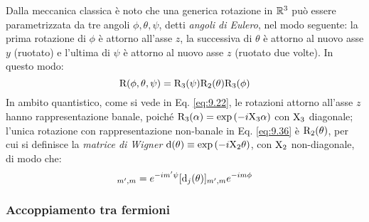 Dalla meccanica classica è noto che una generica rotazione in $ \mathbb{R}^3 $ può essere parametrizzata da tre angoli $ \phi,\theta,\psi $, detti \textit{angoli di Eulero}, nel modo seguente: la prima rotazione di $ \phi $ è attorno all'asse $ z $, la successiva di $ \theta $ è attorno al nuovo asse $ y $ (ruotato) e l'ultima di $ \psi $ è attorno al nuovo asse $ z $ (ruotato due volte). In questo modo:
\begin{equation}
	\mathrm{R}(\phi,\theta,\psi) = \mathrm{R}_3(\psi) \mathrm{R}_2(\theta) \mathrm{R}_3(\phi)
	\label{eq:9.36}
\end{equation}
In ambito quantistico, come si vede in Eq. \ref{eq:9.22}, le rotazioni attorno all'asse $ z $ hanno rappresentazione banale, poiché $ \mathrm{R}_3(\alpha) = \exp \left( -i \mathrm{X}_3 \alpha \right) $ con $ \mathrm{X}_3 $ diagonale; l'unica rotazione con rappresentazione non-banale in Eq. \ref{eq:9.36} è $ \mathrm{R}_2(\theta) $, per cui si definisce la \textit{matrice di Wigner} $ \mathrm{d}(\theta) \equiv \exp \left( -i \mathrm{X}_2 \theta \right) $, con $ \mathrm{X}_2 $ non-diagonale, di modo che:
\begin{equation}
	[\rho_j(\phi,\theta,\psi)]_{m',m} = e^{-i m' \psi} [\tens{d}_j(\theta)]_{m',m} e^{-i m \phi}
	\label{eq:9.37}
\end{equation}

\subsubsection{Accoppiamento tra fermioni}

